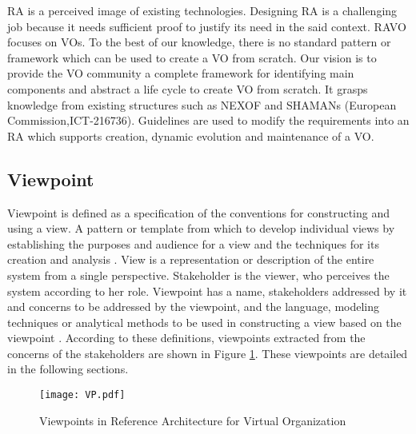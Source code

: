 \documentclass[]{article}
\begin{document}
RA is a perceived image of existing technologies. Designing RA is a challenging job because it needs sufficient proof to justify its need in the said context. RAVO focuses on VOs. To the best of our knowledge, there is no standard pattern or framework which can be used to create a VO from scratch. Our vision is to provide the VO community a complete framework for identifying main components and abstract a life cycle to create VO from scratch. It grasps knowledge from existing structures such as NEXOF \cite{nexof} and SHAMANs (European Commission,ICT-216736). Guidelines are used to modify the requirements into an RA which supports creation, dynamic evolution and maintenance of a VO.

\subsection{Viewpoint}
Viewpoint is defined as a specification of the conventions for constructing and using a view. A pattern or template from which to develop individual views by establishing the purposes and audience for a view and the techniques for its creation and analysis \cite{Jen2000}. View is a representation or description of the entire system from a single perspective. Stakeholder is the viewer, who perceives the system according to her role. Viewpoint has a name, stakeholders addressed by it and concerns to be addressed by the viewpoint, and the language, modeling techniques or analytical methods to be used in constructing a view  based on the viewpoint \cite{Jen2000}.
According to these definitions, viewpoints extracted from the concerns of the stakeholders are shown in Figure \ref{fig:VP}. These viewpoints are detailed in the following sections.
\begin{figure}
  \begin{center}
\texttt{[image: VP.pdf]}
  \caption{Viewpoints in Reference Architecture for Virtual Organization}
  \label{fig:VP}
  \end{center}
\end{figure}
\end{document}
